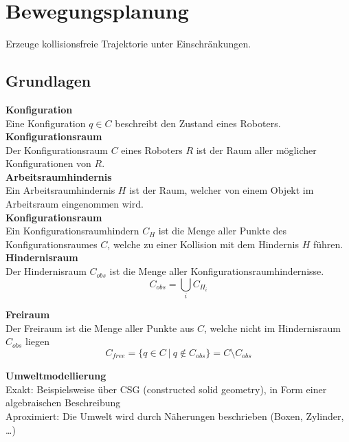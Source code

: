 

\section{Bewegungsplanung}%
\label{bwp:sec:bewegungsplanung}
Erzeuge kollisionsfreie Trajektorie unter Einschränkungen.

\subsection{Grundlagen}%
\label{bwp:sub:grundlagen}
\textbf{Konfiguration}\\
Eine Konfiguration \(q \in C\) beschreibt den Zustand eines Roboters.\\

\textbf{Konfigurationsraum}\\
Der Konfigurationsraum \(C\) eines Roboters \(R\) ist der Raum aller möglicher Konfigurationen von \(R\).\\

\textbf{Arbeitsraumhindernis}\\
Ein Arbeitsraumhindernis \(H\) ist der Raum, welcher von einem Objekt im Arbeitsraum eingenommen wird.\\

\textbf{Konfigurationsraum}\\
Ein Konfigurationsraumhindern \(C_H\) ist die Menge aller Punkte des Konfigurationsraumes \(C\),
welche zu einer Kollision mit dem Hindernis \(H\) führen.\\

\textbf{Hindernisraum}\\
Der Hindernisraum \(C_{\mathit{obs}}\) ist die Menge aller Konfigurationsraumhindernisse.
\[C_{\mathit{obs}} = \bigcup_i C_{H_i} \]

\textbf{Freiraum}\\
Der Freiraum ist die Menge aller Punkte aus \(C\), welche nicht im Hindernisraum \(C_{\mathit{obs}}\) liegen
\[C_{\mathit{free}} = \{q \in C\ |\ q \not \in C_{\mathit{obs}}\} = C \setminus C_{\mathit{obs}}\]

\textbf{Umweltmodellierung}\\
Exakt: Beispielsweise über CSG (constructed solid geometry), in Form einer algebraischen Beschreibung\\
Aproximiert: Die Umwelt wird durch Näherungen beschrieben (Boxen, Zylinder, \ldots)\\


